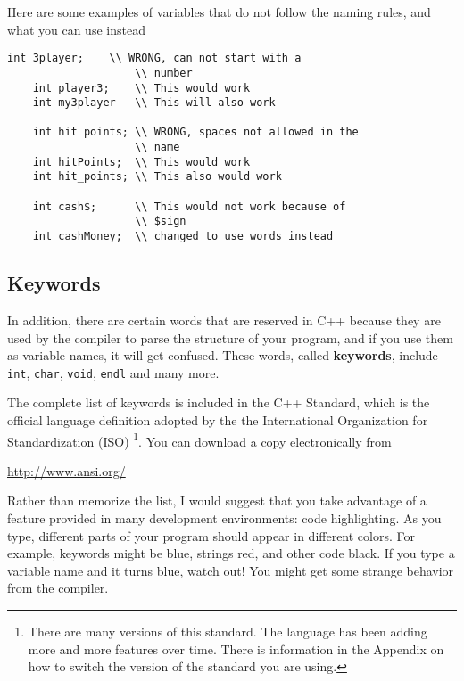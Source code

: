 Here are some examples of variables that do not follow the naming rules, and what you can use instead
\begin{lstlisting}[frame=single]
    int 3player;    \\ WRONG, can not start with a 
                    \\ number
    int player3;    \\ This would work
    int my3player   \\ This will also work
    
    int hit points; \\ WRONG, spaces not allowed in the 
                    \\ name
    int hitPoints;  \\ This would work
    int hit_points; \\ This also would work
    
    int cash$;      \\ This would not work because of 
                    \\ $sign
    int cashMoney;  \\ changed to use words instead
\end{lstlisting}
\subsection{Keywords}
In addition, there
are certain words that are reserved in C++ because they are
used by the compiler to parse the structure of your program,
and if you use them as variable names, it will get confused.
These words, called {\bf keywords}, include {\tt int},
{\tt char}, {\tt void}, {\tt endl} and many more.

The complete list of keywords is included in the C++ Standard, which
is the official language definition adopted by the the International
Organization for Standardization (ISO) \footnote{There are many versions
of this standard. The language has been adding more and more features over
time. There is information in the Appendix on how to switch the version of the
standard you are using.}.  You
can download a copy electronically from
\bigskip

    \url{http://www.ansi.org/}
%
\bigskip

Rather than memorize the list, I would suggest that you
take advantage of a feature provided in many development
environments: code highlighting.  As you type, different
parts of your program should appear in different colors.  For
example, keywords might be blue, strings red, and other code
black.  If you type a variable name and it turns blue, watch
out!  You might get some strange behavior from the compiler.

